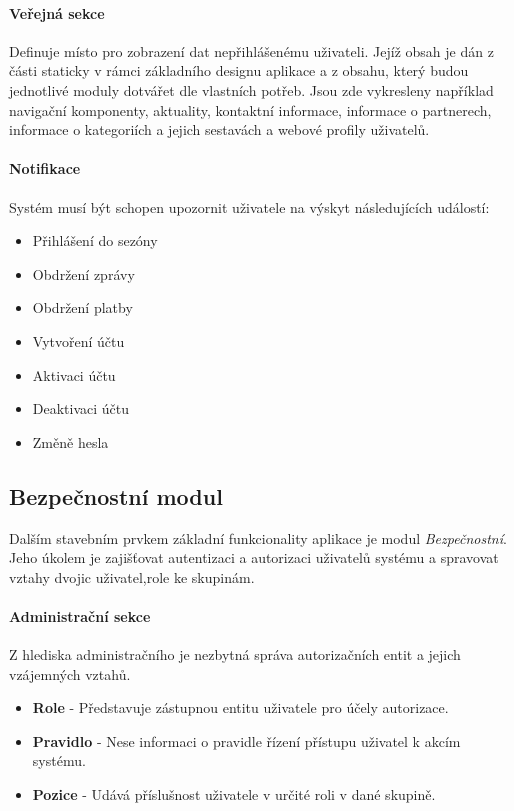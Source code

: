 \documentclass[11pt,oneside]{fithesis}
\begin{document}
            \paragraph*{Veřejná sekce} 

            Definuje místo pro zobrazení dat nepřihlášenému uživateli. Jejíž obsah je dán z části staticky v rámci základního designu aplikace a z obsahu, který budou jednotlivé moduly dotvářet dle vlastních potřeb. Jsou zde vykresleny například navigační komponenty, aktuality, kontaktní informace, informace o partnerech, informace o kategoriích a jejich sestavách a webové profily uživatelů.

            \paragraph*{Notifikace}

            Systém musí být schopen upozornit uživatele na výskyt následujících událostí:
            \begin{itemize}
                \item Přihlášení do sezóny
                \item Obdržení zprávy
                \item Obdržení platby
                \item Vytvoření účtu
                \item Aktivaci účtu
                \item Deaktivaci účtu
                \item Změně hesla
            \end{itemize}

            \subsection{Bezpečnostní modul}
            Dalším stavebním prvkem základní funkcionality aplikace je modul \textit{Bezpečnostní}. Jeho úkolem je zajišťovat autentizaci a autorizaci uživatelů systému a spravovat vztahy dvojic uživatel,role ke skupinám.

            \paragraph*{Administrační sekce}

            Z hlediska administračního je nezbytná správa autorizačních entit a jejich vzájemných vztahů.
            \begin{itemize}
                \item \textbf{Role} - Představuje zástupnou entitu uživatele pro účely autorizace.
                \item \textbf{Pravidlo} - Nese informaci o pravidle řízení přístupu uživatel k akcím systému.
                \item \textbf{Pozice} - Udává příslušnost uživatele v určité roli v dané skupině.
            \end{itemize}
\end{document}
